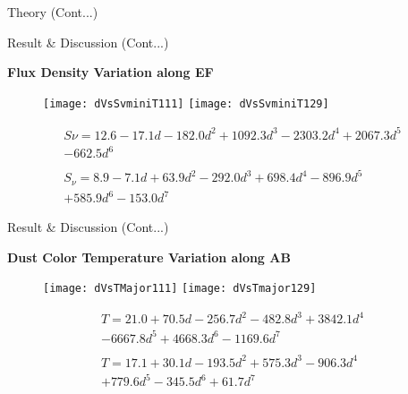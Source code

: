 \documentclass[12pt,a4paper]{beamer}
\begin{document}
\begin{frame}{Theory (Cont...)}
\begin{frame}{Result \& Discussion (Cont...)}
\begin{block}{\centering\textbf{Flux Density Variation along EF \vspace*{.05cm}}}
\begin{itemize}
\begin{figure}[h]
\vspace{0.0cm} \centering
\texttt{[image: dVsSvminiT111]}
\texttt{[image: dVsSvminiT129]}
\end{figure}
\begin{equation*}\label{LB}
\begin{array}{l}
S{\nu}=12.6 - 17.1d - 182.0d^{2} + 1092.3d^{3} - 2303.2d^{4} + 2067.3d^{5}\\ - 662.5d^{6}
\\
\\
S_{\nu} = 8.9 - 7.1d + 63.9d^{2} - 292.0d^{3} + 698.4d^{4} - 896.9d^{5}\\ +585.9d^{6} - 153.0d^{7}
\end{array}
\end{equation*}
\end{itemize}
\end{block}
\end{frame}

\begin{frame}{Result \& Discussion (Cont...)}
\begin{block}{\centering\textbf{Dust Color Temperature Variation along AB \vspace*{.05cm}}}
\begin{itemize}
\begin{figure}[h]
\vspace{0.0cm} \centering
\texttt{[image: dVsTMajor111]}
\texttt{[image: dVsTmajor129]}
\end{figure}
\begin{equation*}\label{LB}
\begin{array}{l}
T = 21.0 + 70.5d - 256.7d^{2} - 482.8d^{3} + 3842.1d^{4}\\ - 6667.8d^{5} + 4668.3d^{6} - 1169.6d^{7}
\\
\\
T = 17.1 + 30.1d - 193.5d^{2} + 575.3d^{3} - 906.3d^{4}\\ + 779.6d^{5} - 345.5d^{6} + 61.7d^{7}
\end{array}
\end{equation*}
\end{itemize}
\end{block}
\end{frame}



\end{frame}
\end{document}
